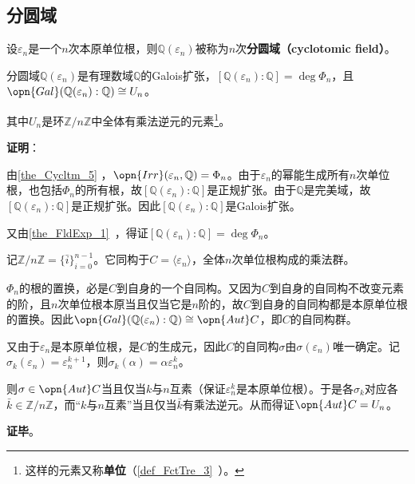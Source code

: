 \subsection{分圆域}

\begin{definition}{}
设$\varepsilon_n$是一个$n$次本原单位根，则$\mathbb{Q}(\varepsilon_n)$被称为$n$次\textbf{分圆域（cyclotomic field）}。
\end{definition}


\begin{theorem}{}
分圆域$\mathbb{Q}(\varepsilon_n)$是有理数域$\mathbb{Q}$的Galois扩张，$[\mathbb{Q}(\varepsilon_n):\mathbb{Q}]=\deg \Phi_n$，且$\opn{Gal}(\mathbb{Q}(\varepsilon_n):\mathbb{Q})\cong U_n$。

其中$U_n$是环$\mathbb{Z}/n\mathbb{Z}$中全体有乘法逆元的元素\footnote{这样的元素又称\textbf{单位}（\autoref{def_FctTre_3}~）。}。
\end{theorem}

\textbf{证明}：

由\autoref{the_Cycltm_5} ，$\opn{Irr}(\varepsilon_n, \mathbb{Q})=\Phi_n$。由于$\varepsilon_n$的幂能生成所有$n$次单位根，也包括$\Phi_n$的所有根，故$[\mathbb{Q}(\varepsilon_n):\mathbb{Q}]$是正规扩张。由于$\mathbb{Q}$是完美域，故$[\mathbb{Q}(\varepsilon_n):\mathbb{Q}]$是正规扩张。因此$[\mathbb{Q}(\varepsilon_n):\mathbb{Q}]$是Galois扩张。

又由\autoref{the_FldExp_1}~，得证$[\mathbb{Q}(\varepsilon_n):\mathbb{Q}]=\deg \Phi_n$。

记$\mathbb{Z}/n\mathbb{Z}=\{\bar{i}\}_{i=0}^{n-1}$。它同构于$C=\langle \varepsilon_n \rangle$，全体$n$次单位根构成的乘法群。

$\Phi_n$的根的置换，必是$C$到自身的一个自同构。又因为$C$到自身的自同构不改变元素的阶，且$n$次单位根本原当且仅当它是$n$阶的，故$C$到自身的自同构都是本原单位根的置换。因此$\opn{Gal}(\mathbb{Q}(\varepsilon_n):\mathbb{Q})\cong \opn{Aut}C$，即$C$的自同构群。

又由于$\varepsilon_n$是本原单位根，是$C$的生成元，因此$C$的自同构$\sigma$由$\sigma(\varepsilon_n)$唯一确定。记$\sigma_k(\varepsilon_n)=\varepsilon_n^{k+1}$，则$\sigma_k(\alpha)=\alpha\varepsilon_n^k$。

则$\sigma\in \opn{Aut}C$当且仅当$k$与$n$互素（保证$\varepsilon_n^k$是本原单位根）。于是各$\sigma_k$对应各$\bar{k}\in\mathbb{Z}/n\mathbb{Z}$，而“$k$与$n$互素”当且仅当$\bar{k}$有乘法逆元。从而得证$\opn{Aut}C=U_n$。

\textbf{证毕}。
































